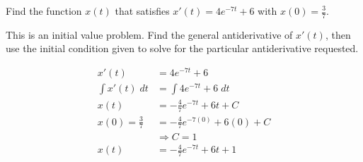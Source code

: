\documentclass{ximera}
\author{Emma Smith Zbarsky}
\begin{document}
\begin{exercise}

Find the function $x(t)$ that satisfies $x'(t) = 4e^{-7t}+6$ with
$x(0)=\frac{3}{7}$.


\begin{hint}
This is an initial value problem. Find the general antiderivative of
$x'(t)$, then use the initial condition given to solve for the
particular antiderivative requested.
\end{hint}


\begin{hint}
\begin{align*}
x'(t) &= 4e^{-7t}+6 \\
\int x'(t) \; dt &= \int 4e^{-7t}+6\; dt \\
x(t) &= -\frac{4}{7}e^{-7t}+6t+C \\
x(0) = \frac{3}{7} &= -\frac{4}{7}e^{-7(0)}+6(0)+C \\
&\Rightarrow C=1 \\
x(t) &= -\frac{4}{7}e^{-7t}+6t+1 \end{align*}
\end{hint}


\begin{multipleChoice}
\end{multipleChoice}

\end{exercise}
\end{document}
